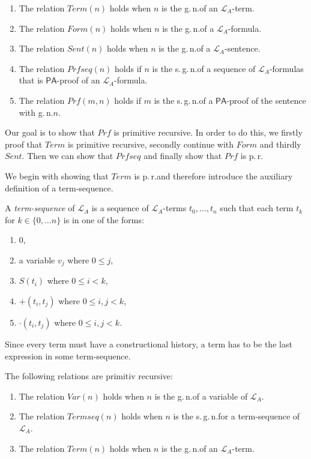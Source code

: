 \begin{dfn}
\begin{enumerate}
\item The relation $\mathit{Term}(n)$ holds when $n$ is the g.\,n.\@ of an $\mathcal{L}_A$-term. 
\item The relation $\mathit{Form}(n)$ holds when $n$ is the g.\,n.\@ of a $\mathcal{L}_A$-formula.
\item The relation $\mathit{Sent}(n)$ holds when $n$ is the g.\,n.\@ of a $\mathcal{L}_A$-sentence.
\item The relation $\mathit{Prfseq}(n)$ holds if $n$ is the s.\,g.\,n.\@ of a sequence of $\mathcal{L}_A$-formulas that is $\mathsf{PA}$-proof of an $\mathcal{L}_A$-formula.
\item The relation $\mathit{Prf}(m,n)$ holds if $m$ is the s.\,g.\,n.\@ of a $\mathsf{PA}$-proof of the sentence with g.\,n.\@ $n$.
\end{enumerate}
\end{dfn}
Our goal is to show that $\mathit{Prf}$ is primitive recursive. In order to do this, we firstly proof that $\mathit{Term}$ is primitive recursive, secondly continue with $\mathit{Form}$ and thirdly $\mathit{Sent}$. Then we can show that $\mathit{Prfseq}$ and finally show that $\mathit{Prf}$ is p.\,r.

We begin with showing that $\mathit{Term}$ is p.\,r.\@ and therefore introduce the auxiliary definition of a term-sequence.

\begin{dfn}
A \textit{term-sequence} of $\mathcal{L}_A$ is a sequence of $\mathcal{L}_A$-terms $ t_0, \ldots , t_n$ such that each term $t_k$ for $k \in \lbrace 0, \ldots n \rbrace $ is in one of the forms:
\begin{enumerate}
\item $0$,
\item a variable $v_j$ where $0 \le j$, 
\item $S( t_i)$ where $0 \le i < k$,
\item $+(t_i,t_j)$ where $0 \le i,j<k$,
\item $\cdot(t_i ,t_j)$ where $0 \le i,j<k$.
\end{enumerate}
\end{dfn}
Since every term must have a constructional history, a term has to be the last expression in some term-sequence.

\begin{lem}
The following relations are primitiv recursive:
\begin{enumerate}
\item The relation $\mathit{Var}(n)$ holds when $n$ is the g.\,n.\@ of a variable of $\mathcal{L}_A$.
\item The relation $\mathit{Termseq}(n)$ holds when $n$ is the s.\,g.\,n.\@ for a term-sequence of $\mathcal{L}_A$.
\item The relation $\mathit{Term}(n)$ holds when $n$ is the g.\,n.\@ of an $\mathcal{L}_A$-term. 
\end{enumerate}
\end{lem}

